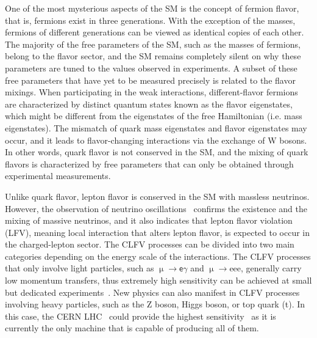 One of the most mysterious aspects of the \ac{SM} is the concept of fermion flavor, that is, fermions exist in three generations. With the exception of the masses, fermions of different generations can be viewed as identical copies of each other. The majority of the free parameters of the \ac{SM}, such as the masses of fermions, belong to the flavor sector, and the \ac{SM} remains completely silent on why these parameters are tuned to the values observed in experiments. A subset of these free parameters that have yet to be measured precisely is related to the flavor mixings. When participating in the weak interactions, different-flavor fermions are characterized by distinct quantum states known as the flavor eigenstates, which might be different from the eigenstates of the free Hamiltonian (i.e. mass eigenstates). The mismatch of quark mass eigenstates and flavor eigenstates may occur, and it leads to flavor-changing interactions via the exchange of W bosons. In other words, quark flavor is not conserved in the \ac{SM}, and the mixing of quark flavors is characterized by free parameters that can only be obtained through experimental measurements. 

Unlike quark flavor, lepton flavor is conserved in the \ac{SM} with massless neutrinos. However, the observation of neutrino oscillations~\cite{Super-Kamiokande:1998kpq,SNO:2002tuh} confirms the existence and the mixing of massive neutrinos, and it also indicates that lepton flavor violation (LFV), meaning local interaction that alters lepton flavor, is expected to occur in the charged-lepton sector. The \ac{CLFV} processes can be divided into two main categories depending on the energy scale of the interactions. The \ac{CLFV} processes that only involve light particles, such as $\upmu\rightarrow\textsf{e}\gamma$ and $\upmu\rightarrow$eee, generally carry low momentum transfers, thus extremely high sensitivity can be achieved at small but dedicated experiments~\cite{MEGII:2018kmf,Mu3e:2020gyw}. New physics can also manifest in \ac{CLFV} processes involving heavy particles, such as the Z boson, Higgs boson, or top quark (t). In this case, the \ac{CERN} \ac{LHC}~\cite{Evans:2008zzb} could provide the highest sensitivity~\cite{Davidson:2012wn} as it is currently the only machine that is capable of producing all of them.

